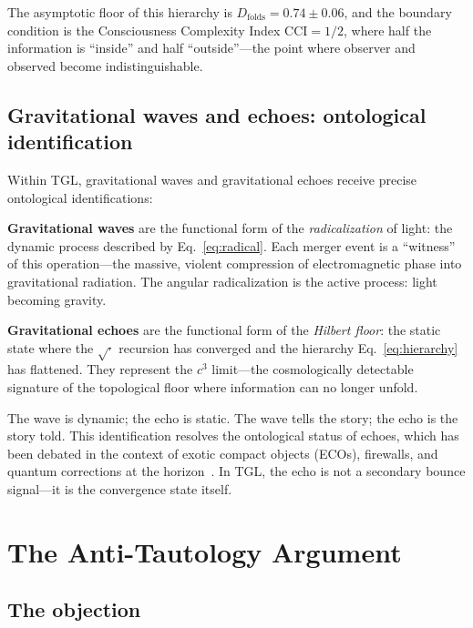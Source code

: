 \documentclass[12pt,a4paper,twocolumn]{article}
\newcommand{\Dfolds}{D_{\text{folds}}}
\newcommand{\CCI}{\text{CCI}}
\begin{document}
The asymptotic floor of this hierarchy is $\Dfolds = 0.74 \pm 0.06$, and the boundary condition is the Consciousness Complexity Index $\CCI = 1/2$, where half the information is ``inside'' and half ``outside''---the point where observer and observed become indistinguishable.

\subsection{Gravitational waves and echoes: ontological identification}
\label{sec:echoes}

Within TGL, gravitational waves and gravitational echoes receive precise ontological identifications:

\textbf{Gravitational waves} are the functional form of the \emph{radicalization} of light: the dynamic process described by Eq.~\eqref{eq:radical}. Each merger event is a ``witness'' of this operation---the massive, violent compression of electromagnetic phase into gravitational radiation. The angular radicalization is the active process: light becoming gravity.

\textbf{Gravitational echoes} are the functional form of the \emph{Hilbert floor}: the static state where the $\sqrt{\cdot}$ recursion has converged and the hierarchy Eq.~\eqref{eq:hierarchy} has flattened. They represent the $c^3$ limit---the cosmologically detectable signature of the topological floor where information can no longer unfold.

The wave is dynamic; the echo is static. The wave tells the story; the echo is the story told. This identification resolves the ontological status of echoes, which has been debated in the context of exotic compact objects (ECOs), firewalls, and quantum corrections at the horizon~\cite{Cardoso2016,Abedi2017,Westerweck2018}. In TGL, the echo is not a secondary bounce signal---it is the convergence state itself.


\section{The Anti-Tautology Argument}
\label{sec:anti-tautology}

\subsection{The objection}
\end{document}
